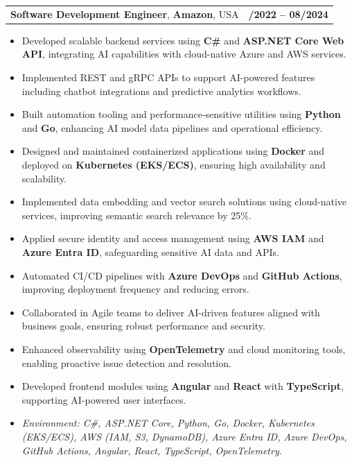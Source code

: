 \documentclass[letterpaper,11pt]{article}
\makeatletter
\newcommand{\resumeItem}[1]{
  \item\footnotesize{
    {#1 \vspace{-2pt}}
  }
}
\newcommand{\resumeSubheading}[4]{
  \vspace{-2pt}\item
    \begin{tabular*}{1.0\textwidth}[t]{l@{\extracolsep{\fill}}r}
      \textbf{\fontsize{10pt}{14pt}\selectfont #3}, \textbf{\fontsize{10pt}{14pt}\selectfont #1}, \fontsize{10pt}{14pt}\selectfont #4 & \textbf{\fontsize{10pt}{14pt}\selectfont #2} \\
    \end{tabular*}\vspace{-7pt}
}
\newcommand{\resumeItemListStart}{\begin{itemize}[leftmargin=*]}
\newcommand{\resumeItemListEnd}{\end{itemize}\vspace{-5pt}}
\makeatother
\begin{document}
\resumeSubheading
{Amazon}{10/2022 -- 08/2024}
{Software Development Engineer}{USA}
\resumeItemListStart
  \resumeItem{Developed scalable backend services using \textbf{C\#} and \textbf{ASP.NET Core Web API}, integrating AI capabilities with cloud-native Azure and AWS services.}
  \resumeItem{Implemented REST and gRPC APIs to support AI-powered features including chatbot integrations and predictive analytics workflows.}
  \resumeItem{Built automation tooling and performance-sensitive utilities using \textbf{Python} and \textbf{Go}, enhancing AI model data pipelines and operational efficiency.}
  \resumeItem{Designed and maintained containerized applications using \textbf{Docker} and deployed on \textbf{Kubernetes (EKS/ECS)}, ensuring high availability and scalability.}
  \resumeItem{Implemented data embedding and vector search solutions using cloud-native services, improving semantic search relevance by 25\%.}
  \resumeItem{Applied secure identity and access management using \textbf{AWS IAM} and \textbf{Azure Entra ID}, safeguarding sensitive AI data and APIs.}
  \resumeItem{Automated CI/CD pipelines with \textbf{Azure DevOps} and \textbf{GitHub Actions}, improving deployment frequency and reducing errors.}
  \resumeItem{Collaborated in Agile teams to deliver AI-driven features aligned with business goals, ensuring robust performance and security.}
  \resumeItem{Enhanced observability using \textbf{OpenTelemetry} and cloud monitoring tools, enabling proactive issue detection and resolution.}
  \resumeItem{Developed frontend modules using \textbf{Angular} and \textbf{React} with \textbf{TypeScript}, supporting AI-powered user interfaces.}
  \resumeItem{\textit{Environment: C\#, ASP.NET Core, Python, Go, Docker, Kubernetes (EKS/ECS), AWS (IAM, S3, DynamoDB), Azure Entra ID, Azure DevOps, GitHub Actions, Angular, React, TypeScript, OpenTelemetry.}}
\resumeItemListEnd
\end{document}
